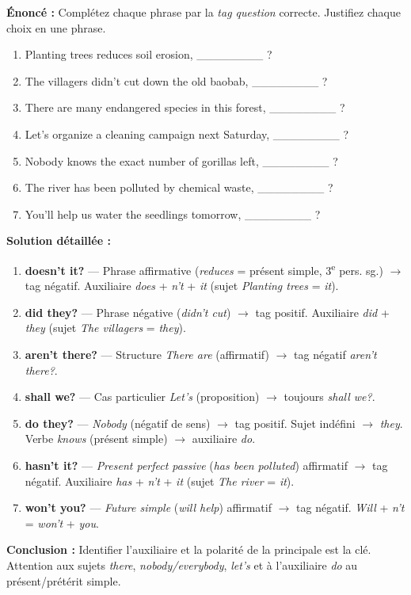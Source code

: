 \documentclass[11pt]{article}
\begin{document}
\begin{exoresolu}
\textbf{Énoncé :} Complétez chaque phrase par la \emph{tag question} correcte. Justifiez chaque choix en une phrase.

\begin{enumerate}
    \item Planting trees reduces soil erosion, \_\_\_\_\_\_\_\_ ?
    \item The villagers didn't cut down the old baobab, \_\_\_\_\_\_\_\_ ?
    \item There are many endangered species in this forest, \_\_\_\_\_\_\_\_ ?
    \item Let's organize a cleaning campaign next Saturday, \_\_\_\_\_\_\_\_ ?
    \item Nobody knows the exact number of gorillas left, \_\_\_\_\_\_\_\_ ?
    \item The river has been polluted by chemical waste, \_\_\_\_\_\_\_\_ ?
    \item You'll help us water the seedlings tomorrow, \_\_\_\_\_\_\_\_ ?
\end{enumerate}

\tcblower
\textbf{Solution détaillée :}
\begin{enumerate}
    \item \textbf{doesn't it?} — Phrase affirmative (\emph{reduces} = présent simple, 3\textsuperscript{e} pers. sg.) $\rightarrow$ tag négatif. Auxiliaire \emph{does} + \emph{n't} + \emph{it} (sujet \emph{Planting trees} = \emph{it}).
    \item \textbf{did they?} — Phrase négative (\emph{didn't cut}) $\rightarrow$ tag positif. Auxiliaire \emph{did} + \emph{they} (sujet \emph{The villagers} = \emph{they}).
    \item \textbf{aren't there?} — Structure \emph{There are} (affirmatif) $\rightarrow$ tag négatif \emph{aren't there?}.
    \item \textbf{shall we?} — Cas particulier \emph{Let's} (proposition) $\rightarrow$ toujours \emph{shall we?}.
    \item \textbf{do they?} — \emph{Nobody} (négatif de sens) $\rightarrow$ tag positif. Sujet indéfini $\rightarrow$ \emph{they}. Verbe \emph{knows} (présent simple) $\rightarrow$ auxiliaire \emph{do}.
    \item \textbf{hasn't it?} — \emph{Present perfect passive} (\emph{has been polluted}) affirmatif $\rightarrow$ tag négatif. Auxiliaire \emph{has} + \emph{n't} + \emph{it} (sujet \emph{The river} = \emph{it}).
    \item \textbf{won't you?} — \emph{Future simple} (\emph{will help}) affirmatif $\rightarrow$ tag négatif. \emph{Will} + \emph{n't} = \emph{won't} + \emph{you}.
\end{enumerate}
\textbf{Conclusion :} Identifier l'auxiliaire et la polarité de la principale est la clé. Attention aux sujets \emph{there}, \emph{nobody/everybody}, \emph{let's} et à l'auxiliaire \emph{do} au présent/prétérit simple.
\end{exoresolu}
\end{document}

